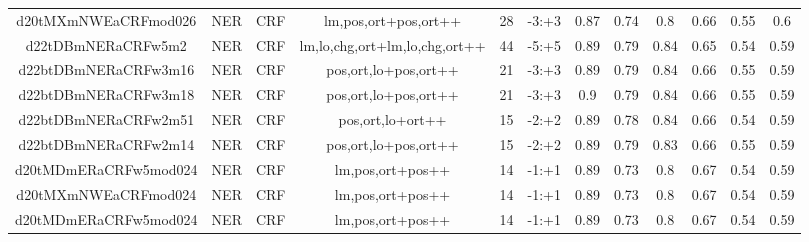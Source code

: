 \documentclass[a4paper]{article}
\begin{document}
\begin{landscape}
\begin{center}
\begin{tabular}{ |c|c|c|c|c|c|c|c|c|c|c|c|}
 	
 
 	
 		
 		\small{ d20tMXmNWEaCRFmod026 } & NER & CRF & lm,pos,ort+pos,ort++  &  28 &  -3:+3  &  0.87 & 0.74 & 0.8  &  0.66 & 0.55 & 0.6 \\
 		

 	
 
 	
 		
 		\small{ d22tDBmNERaCRFw5m2 } & NER & CRF & lm,lo,chg,ort+lm,lo,chg,ort++  &  44 &  -5:+5  &  0.89 & 0.79 & 0.84  &  0.65 & 0.54 & 0.59 \\
 		

 	
 
 	
 		
 		\small{ d22btDBmNERaCRFw3m16 } & NER & CRF & pos,ort,lo+pos,ort++  &  21 &  -3:+3  &  0.89 & 0.79 & 0.84  &  0.66 & 0.55 & 0.59 \\
 		

 	
 
 	
 		
 		\small{ d22btDBmNERaCRFw3m18 } & NER & CRF & pos,ort,lo+pos,ort++  &  21 &  -3:+3  &  0.9 & 0.79 & 0.84  &  0.66 & 0.55 & 0.59 \\
 		

 	
 
 	
 		
 		\small{ d22btDBmNERaCRFw2m51 } & NER & CRF & pos,ort,lo+ort++  &  15 &  -2:+2  &  0.89 & 0.78 & 0.84  &  0.66 & 0.54 & 0.59 \\
 		

 	
 
 	
 		
 		\small{ d22btDBmNERaCRFw2m14 } & NER & CRF & pos,ort,lo+pos,ort++  &  15 &  -2:+2  &  0.89 & 0.79 & 0.83  &  0.66 & 0.55 & 0.59 \\
 		

 	
 
 	
 		
 		\small{ d20tMDmERaCRFw5mod024 } & NER & CRF & lm,pos,ort+pos++  &  14 &  -1:+1  &  0.89 & 0.73 & 0.8  &  0.67 & 0.54 & 0.59 \\
 		

 	
 
 	
 		
 		\small{ d20tMXmNWEaCRFmod024 } & NER & CRF & lm,pos,ort+pos++  &  14 &  -1:+1  &  0.89 & 0.73 & 0.8  &  0.67 & 0.54 & 0.59 \\
 		

 	
 
 	
 		
 		\small{ d20tMDmERaCRFw5mod024 } & NER & CRF & lm,pos,ort+pos++  &  14 &  -1:+1  &  0.89 & 0.73 & 0.8  &  0.67 & 0.54 & 0.59 \\
 		


\end{tabular}
\end{center}
\end{landscape}
\end{document}
